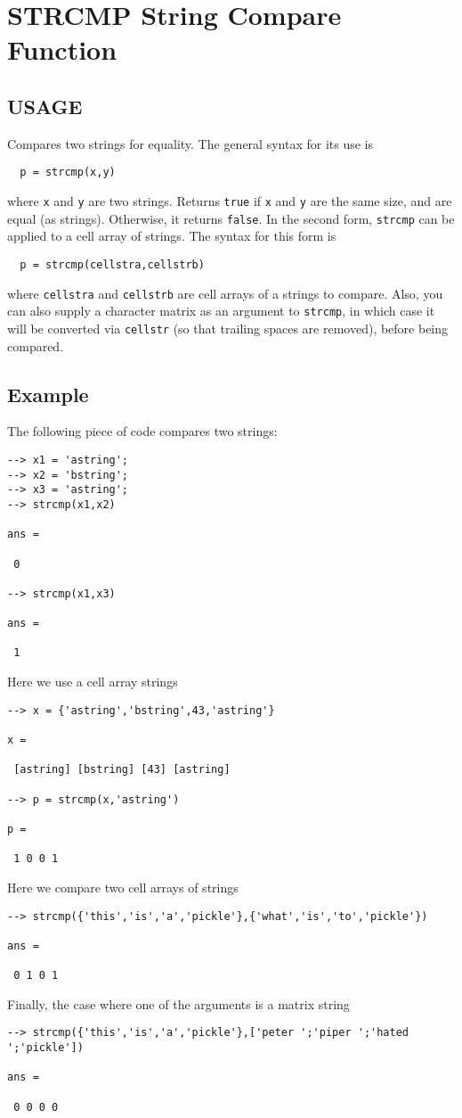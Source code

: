 \section{STRCMP String Compare Function}

\subsection{USAGE}

Compares two strings for equality.  The general
syntax for its use is
\begin{verbatim}
  p = strcmp(x,y)
\end{verbatim}
where \verb|x| and \verb|y| are two strings.  Returns \verb|true| if \verb|x|
and \verb|y| are the same size, and are equal (as strings).  Otherwise,
it returns \verb|false|.
In the second form, \verb|strcmp| can be applied to a cell array of
strings.  The syntax for this form is
\begin{verbatim}
  p = strcmp(cellstra,cellstrb)
\end{verbatim}
where \verb|cellstra| and \verb|cellstrb| are cell arrays of a strings
to compare.  Also, you can also supply a character matrix as
an argument to \verb|strcmp|, in which case it will be converted
via \verb|cellstr| (so that trailing spaces are removed), before being
compared.
\subsection{Example}

The following piece of code compares two strings:
\begin{verbatim}
--> x1 = 'astring';
--> x2 = 'bstring';
--> x3 = 'astring';
--> strcmp(x1,x2)

ans = 

 0 

--> strcmp(x1,x3)

ans = 

 1 
\end{verbatim}
Here we use a cell array strings
\begin{verbatim}
--> x = {'astring','bstring',43,'astring'}

x = 

 [astring] [bstring] [43] [astring] 

--> p = strcmp(x,'astring')

p = 

 1 0 0 1 
\end{verbatim}
Here we compare two cell arrays of strings
\begin{verbatim}
--> strcmp({'this','is','a','pickle'},{'what','is','to','pickle'})

ans = 

 0 1 0 1 
\end{verbatim}
Finally, the case where one of the arguments is a matrix
string
\begin{verbatim}
--> strcmp({'this','is','a','pickle'},['peter ';'piper ';'hated ';'pickle'])

ans = 

 0 0 0 0 
\end{verbatim}
